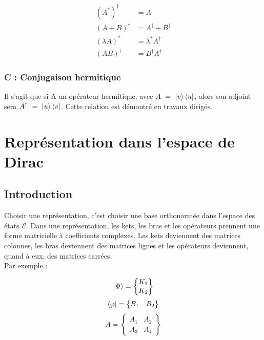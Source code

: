 \documentclass[12pt,a4paper,titlepage]{book}
\begin{document}
\begin{align*}
(A^*)^\dagger &= A\\
(A+B)^\dagger &= A^\dagger + B^\dagger\\
(\lambda A)^* &= \lambda^* A^\dagger\\
(AB)^\dagger &= B^\dagger A^\dagger
\end{align*}

\subsubsection{C : Conjugaison hermitique}
Il s'agit que si A un opérateur hermitique, avec $A ~=~ \ket v \bra u$, alors son adjoint sera $A^\dagger ~=~ \ket u \bra v$. Cette relation est démontré en travaux dirigés.

\section{Représentation dans l'espace de Dirac}
\subsection{Introduction}

Choisir une représentation, c'est choisir une base orthonormée dans l'espace des états $\mathcal{E}$. Dans une représentation, les kets, les bras et les opérateurs prennent une forme matricielle à coefficients complexes. Les kets deviennent des matrices colonnes, les bras deviennent des matrices lignes et les opérateurs deviennent, quand à eux, des matrices carrées.\\

Par exemple :
\begin{center}
\[
\ket{\Psi}=
\left\lbrace
\begin{matrix}
K_1 \\
K_2
\end{matrix}
\right\rbrace
\]
\[
\bra{\varphi}=
\left\lbrace
\begin{matrix}
B_1 & B_2\\
\end{matrix}
\right\rbrace
\]
\[
A=
\left\lbrace
\begin{matrix}
A_1 & A_2\\
A_3 & A_4
\end{matrix}
\right\rbrace
\]
\end{center}
\end{document}
